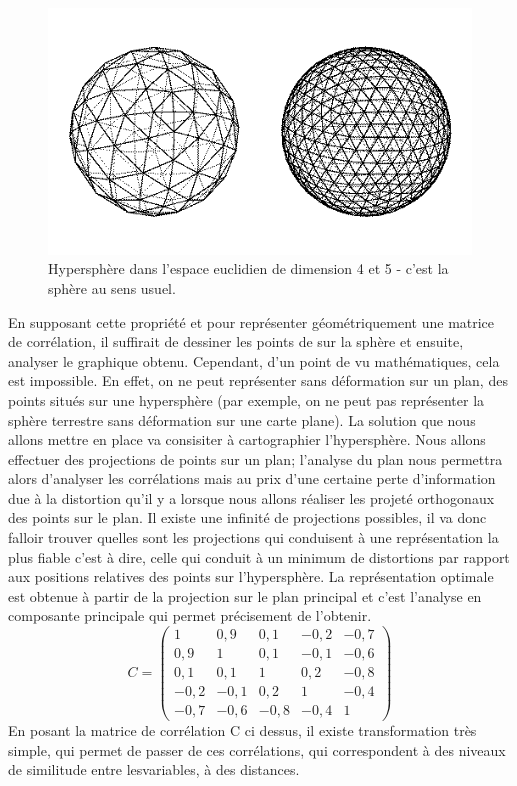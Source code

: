 \begin{figure}[H]\begin{center}\includegraphics[scale=0.35]{ilu/hypersphere45.png}\caption{Hypersphère dans l'espace euclidien de dimension 4 et 5 - c'est la sphère au sens usuel.}\end{center}\end{figure}

En supposant cette propriété et pour représenter géométriquement une matrice de corrélation, il suffirait de dessiner les points de sur la sphère et ensuite, analyser le graphique obtenu. Cependant, d'un point de vu mathématiques, cela est impossible. En effet, on ne peut représenter sans déformation sur un plan, des points situés sur une hypersphère (par exemple, on ne peut pas représenter la sphère terrestre sans déformation sur une carte plane).\newline
La solution que nous allons mettre en place va consisiter à cartographier l'hypersphère. Nous allons effectuer des projections de points sur un plan; l'analyse du plan nous permettra alors d'analyser les corrélations mais au prix d'une certaine perte d'information due à la distortion qu'il y a lorsque nous allons réaliser les projeté orthogonaux des points sur le plan.\newline
Il existe une infinité de projections possibles, il va donc falloir trouver quelles sont les projections qui conduisent à une représentation la plus fiable c'est à dire, celle qui conduit à un minimum de distortions par rapport aux positions relatives des points sur l'hypersphère.\newline
La représentation optimale est obtenue à partir de la projection sur le plan principal et c'est l'analyse en composante principale qui permet précisement de l'obtenir.\newline
\\
$$C = \begin{pmatrix} 
1 & 0,9 & 0,1 & - 0,2 & -0,7 \\
0,9 & 1 & 0,1 & -0,1 &-0,6 \\
0,1 & 0,1 & 1 & 0,2 & -0,8\\
-0,2 & -0,1 & 0,2 & 1 & -0,4 \\
-0,7 & -0,6 & -0,8 & -0,4 & 1
\end{pmatrix}$$
En posant la matrice de corrélation C ci dessus, il existe transformation très simple, qui permet de passer de ces corrélations, qui correspondent à des niveaux de similitude entre lesvariables, à des distances. 

